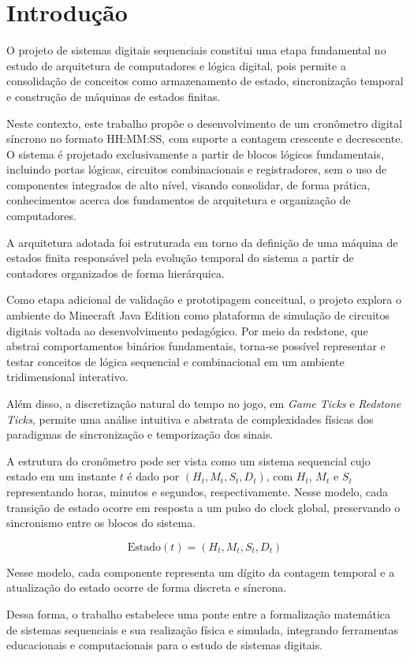 \section{Introdução}

O projeto de sistemas digitais sequenciais constitui uma etapa fundamental no estudo de arquitetura de computadores e lógica digital, pois permite a consolidação de conceitos como armazenamento de estado, sincronização temporal e construção de máquinas de estados finitas.

Neste contexto, este trabalho propõe o desenvolvimento de um cronômetro digital síncrono no formato HH:MM:SS, com suporte a contagem crescente e decrescente. O sistema é projetado exclusivamente a partir de blocos lógicos fundamentais, incluindo portas lógicas, circuitos combinacionais e registradores, sem o uso de componentes integrados de alto nível, visando consolidar, de forma prática, conhecimentos acerca dos fundamentos de arquitetura e organização de computadores.

A arquitetura adotada foi estruturada em torno da definição de uma máquina de estados finita responsável pela evolução temporal do sistema a partir de contadores organizados de forma hierárquica.

Como etapa adicional de validação e prototipagem conceitual, o projeto explora o ambiente do Minecraft Java Edition como plataforma de simulação de circuitos digitais voltada ao desenvolvimento pedagógico. Por meio da redstone, que abstrai comportamentos binários fundamentais, torna-se possível representar e testar conceitos de lógica sequencial e combinacional em um ambiente tridimensional interativo.

Além disso, a discretização natural do tempo no jogo, em \textit{Game Ticks} e \textit{Redstone Ticks}, permite uma análise intuitiva e abstrata de complexidades físicas dos paradigmas de sincronização e temporização dos sinais.

A estrutura do cronômetro pode ser vista como um sistema sequencial cujo estado em um instante $t$ é dado por $(H_t, M_t, S_t, D_t)$, com $H_t$, $M_t$ e $S_t$ representando horas, minutos e segundos, respectivamente. Nesse modelo, cada transição de estado ocorre em resposta a um pulso do clock global, preservando o sincronismo entre os blocos do sistema.

\begin{equation}
    \text{Estado}(t) = (H_t, M_t, S_t, D_t)
\end{equation}

Nesse modelo, cada componente representa um dígito da contagem temporal e a atualização do estado ocorre de forma discreta e síncrona.

Dessa forma, o trabalho estabelece uma ponte entre a formalização matemática de sistemas sequenciais e sua realização física e simulada, integrando ferramentas educacionais e computacionais para o estudo de sistemas digitais.

\label{sec:cronometro}